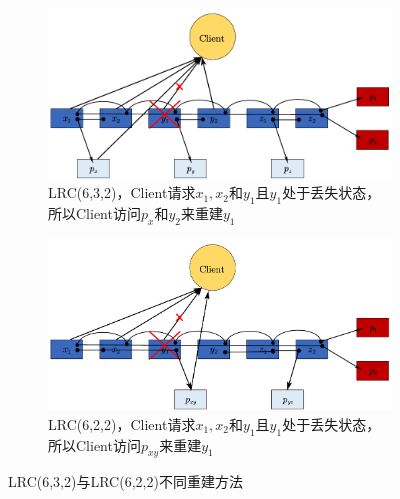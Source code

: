 \begin{figure}[tb!]
	\centering
	\begin{subfigure}[b]{0.8\textwidth}
		\centering
		\includegraphics[scale=0.7]{figures/2.2.pdf}
		\caption{LRC(6,3,2)，Client请求$x_1,x_2$和$y_1$且$y_1$处于丢失状态，所以Client访问$p_x$和$y_2$来重建$y_1$}
		\label{fig:2.2}
	\end{subfigure}
	\begin{subfigure}[b]{0.8\textwidth}
		\centering
		\includegraphics[scale=0.35]{figures/2.3.pdf}
		\caption{LRC(6,2,2)，Client请求$x_1,x_2$和$y_1$且$y_1$处于丢失状态，所以Client访问$p_{xy}$来重建$y_1$}
		\label{fig:2.3}
	\end{subfigure}
	\caption{LRC(6,3,2)与LRC(6,2,2)不同重建方法}
	\label{fig:2.2-3}
\end{figure}


